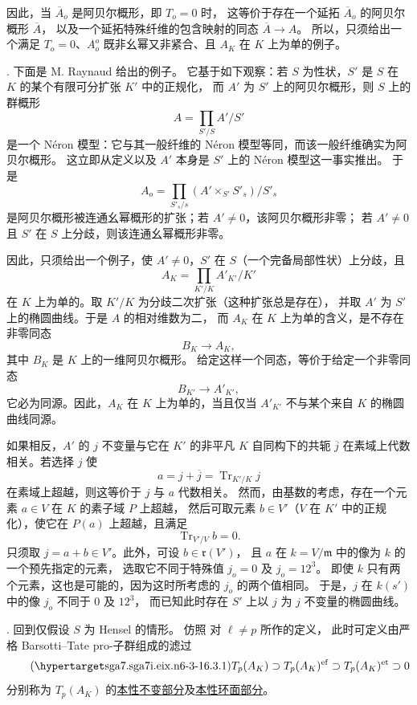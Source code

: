 因此，当 $\overline A_o$ 是阿贝尔概形，即 $T_o=0$ 时，
这等价于存在一个延拓 $\overline A_o$ 的阿贝尔概形 $\overline A$，
以及一个延拓特殊纤维的包含映射的同态 $\overline A\longrightarrow A$。
所以，只须给出一个满足 $T_o=0$、$A_o^o$ 既非幺幂又非紧合、且 $A_K$ 在 $K$ 上为单的例子。

\medskip
\noindent
{}. 下面是 M. Raynaud 给出的例子。
它基于如下观察：若 $S$ 为性状，$S'$ 是 $S$ 在 $K$ 的某个有限可分扩张 $K'$ 中的正规化，
而 $A'$ 为 $S'$ 上的阿贝尔概形，则 $S$ 上的群概形
\[
 A=\prod_{S'/S} A'/S'
\]
是一个 N\'eron 模型：它与其一般纤维的 N\'eron 模型等同，而该一般纤维确实为阿贝尔概形。
这立即从定义以及 $A'$ 本身是 $S'$ 上的 N\'eron 模型这一事实推出。
于是
\[
 A_o=\prod_{S'_s/s}(A'\times_{S'}S'_s)/S'_s
\]
是阿贝尔概形被连通幺幂概形的扩张；若 $A'\neq0$，该阿贝尔概形非零；
若 $A'\neq0$ 且 $S'$ 在 $S$ 上分歧，则该连通幺幂概形非零。

因此，只须给出一个例子，使 $A'\neq0$，$S'$ 在 $S$（一个完备局部性状）上分歧，且
\[
 A_K=\prod_{K'/K}A'_{K'}/K'
\]
在 $K$ 上为单的。取 $K'/K$ 为分歧二次扩张（这种扩张总是存在），
并取 $A'$ 为 $S'$ 上的椭圆曲线。于是 $A$ 的相对维数为二，
而 $A_K$ 在 $K$ 上为单的含义，是不存在非零同态
\[
 B_K\longrightarrow A_K,
\]
其中 $B_K$ 是 $K$ 上的一维阿贝尔概形。
给定这样一个同态，等价于给定一个非零同态
\[
 B_{K'}\longrightarrow A'_{K'},
\]
它必为同源。因此，$A_K$ 在 $K$ 上为单的，当且仅当 $A'_{K'}$ 不与某个来自 $K$ 的椭圆曲线同源。

如果相反，$A'$ 的 $j$ 不变量与它在 $K'$ 的非平凡 $K$ 自同构下的共轭 $\overline j$
在素域上代数相关。若选择 $j$ 使
\[
 a=j+\overline j=\operatorname{Tr}_{K'/K}j
\]
在素域上超越，则这等价于 $j$ 与 $a$ 代数相关。
然而，由基数的考虑，存在一个元素 $a\in V$ 在 $K$ 的素子域 $P$ 上超越，
然后可取元素 $b\in V'$（$V$ 在 $K'$ 中的正规化），使它在 $P(a)$ 上超越，且满足
\[
 \operatorname{Tr}_{V'/V}b=0.
\]
只须取 $j=a+b\in V'$。此外，可设 $b\in\mathfrak r(V')$，
且 $a$ 在 $k=V/\mathfrak m$ 中的像为 $k$ 的一个预先指定的元素，
选取它不同于特殊值 $j_o=0$ 及 $j_o=12^3$。
即使 $k$ 只有两个元素，这也是可能的，因为这时所考虑的 $j_o$ 的两个值相同。
于是，$j$ 在 $k(s')$ 中的像 $j_o$ 不同于 $0$ 及 $12^3$，
而已知此时存在 $S'$ 上以 $j$ 为 $j$ 不变量的椭圆曲线。

\medskip
\noindent
{}. 回到仅假设 $S$ 为 Hensel 的情形。
仿照  对 $\ell\neq p$ 所作的定义，
此时可定义由严格 Barsotti--Tate pro-子群组成的滤过
\begin{equation}\tag{\SGARefTarget{sga7.sga7i.eix.n6-3-1}{6.3.1}}
 T_p(A_K)\supset T_p(A_K)^{\mathrm{ef}}
 \supset T_p(A_K)^{\mathrm{et}}\supset0
\end{equation}
分别称为 $T_p(A_K)$ 的\underline{本性不变部分}及\underline{本性环面部分}。

